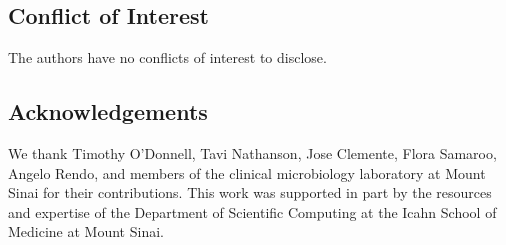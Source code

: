 \subsection*{Conflict of Interest}

The authors have no conflicts of interest to disclose.

\subsection*{Acknowledgements}

We thank Timothy O’Donnell, Tavi Nathanson, Jose Clemente, Flora Samaroo, Angelo Rendo, and members of the clinical microbiology laboratory at Mount Sinai for their contributions. This work was supported in part by the resources and expertise of the Department of Scientific Computing at the Icahn School of Medicine at Mount Sinai.